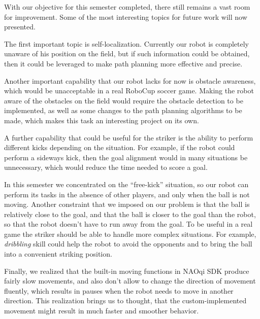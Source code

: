 With our objective for this semester completed, there still remains a vast room
for improvement. Some of the most interesting topics for future work will now
presented.

The first important topic is self-localization. Currently our robot is
completely unaware of his position on the field, but if such information could
be obtained, then it could be leveraged to make path planning more effective
and precise.

Another important capability that our robot lacks for now is obstacle
awareness, which would be unacceptable in a real RoboCup soccer game. Making
the robot aware of the obstacles on the field would require the obstacle
detection to be implemented, as well as some changes to the path planning
algorithms to be made, which makes this task an interesting project on its own.

A further capability that could be useful for the striker is the ability to
perform different kicks depending on the situation. For example, if the robot
could perform a sideways kick, then the goal alignment would in many situations
be unnecessary, which would reduce the time needed to score a goal.

In this semester we concentrated on the ``free-kick'' situation, so our robot
can perform its tasks in the absence of other players, and only when the ball
is not moving. Another constraint that we imposed on our problem is that the
ball is relatively close to the goal, and that the ball is closer to the goal
than the robot, so that the robot doesn't have to run away from the goal. To be
useful in a real game the striker should be able to handle more complex
situations. For example, \textit{dribbling} skill could help the robot to avoid
the opponents and to bring the ball into a convenient striking position.

Finally, we realized that the built-in moving functions in NAOqi SDK produce
fairly slow movements, and also don't allow to change the direction of movement
fluently, which results in pauses when the robot needs to move in another
direction. This realization brings us to thought, that the custom-implemented
movement might result in much faster and smoother behavior.
